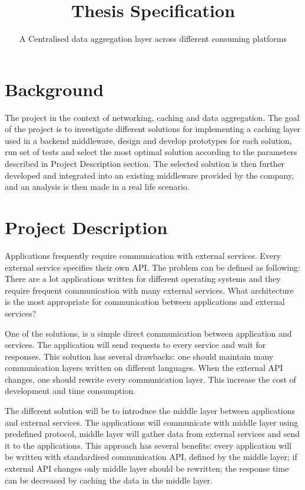 \documentclass[11pt, a4paper]{scrartcl}
\title{Thesis Specification}
\subtitle{A Centralised data aggregation layer across different consuming platforms}
\begin{document}
\maketitle

\section{Background}


The project in the context of networking, caching and data aggregation. The goal of the project is to investigate different solutions for implementing a caching layer used in a backend middleware, design and develop prototypes for each solution, run set of tests and select the most optimal solution according to the parameters described in Project Description section.
The selected solution is then further developed and integrated into an existing middleware provided by the company, and an analysis is then made in a real life scenario.



\section{Project Description}

Applications frequently require communication with external services. Every external service specifies their own API. The problem can be defined as following:  There are a lot applications written for different operating systems and they require frequent communication with many external services. What architecture is the most appropriate for communication between applications and external services? 

One of the solutions, is a simple direct communication between application and services. The application will send requests to every service and wait for responses. This solution has several drawbacks: one should maintain many communication layers written on different languages. When the external API changes, one should rewrite every communication layer. This increase the cost of development and time consumption. 

The different solution will be to introduce the middle layer between applications and external services. The applications will communicate with middle layer using predefined protocol, middle layer will gather data from external services and send it to the applications. This approach has several benefits: every application will be written with standardised communication API, defined by the middle layer; if external API changes only middle layer should be rewritten; the response time can be decreased by caching the data in the middle layer. 
\end{document}
